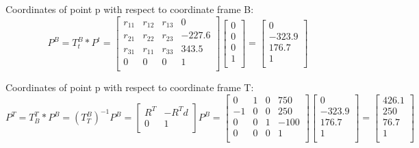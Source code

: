 \documentclass[12pt,norsk,a4paper]{article}
\begin{document}
        Coordinates of point p with respect to coordinate frame B:\\
        \[P^B = T_t^B*P^t
        = \left[ \begin{array}{cccc}
            r_{11}   &   r_{12}  &    r_{13}   &    0 \\
            r_{21}   & r_{22}    &   r_{23}    &   -227.6 \\
            r_{31}   &  r_{11}   &   r_{33}    &   343.5 \\
            0        &  0        &   0         &   1 \\
            \end{array} \right]
            \left[ \begin{array}{c}
                0\\
                0\\
                0\\
                1\\
                \end{array} \right]
        =  \left[ \begin{array}{cccc}
            0 \\
            -323.9 \\
            176.7 \\
            1 \\
            \end{array} \right]
            \]

        Coordinates of point p with respect to coordinate frame T:\\
        \[P^T = T_B^T*P^B = {(T_T^B)}^{-1}P^B
        = \left[ \begin{array}{cc}
            R^T & -R^Td \\
            0 & 1\\
            \end{array} \right]P^B
        = \left[ \begin{array}{cccc}
            0     &   1    &    0   &    750 \\
            -1   &  0    &   0    &   250 \\
            0  & 0    &   1    & -100 \\
            0     &  0     &   0    &   1 \\
            \end{array} \right]
            \left[ \begin{array}{cccc}
                0 \\
                -323.9 \\
                176.7 \\
                1 \\
                \end{array} \right]
            =\left[ \begin{array}{cccc}
                426.1 \\
                250 \\
                76.7 \\
                1 \\
                \end{array} \right]\]
        
\end{document}
